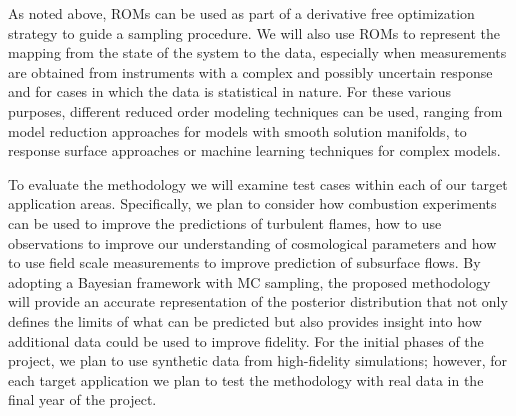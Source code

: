 \documentclass[11pt]{article}
\begin{document}
As noted above, ROMs can be used as
part of a derivative free optimization strategy
to guide a sampling procedure. We will also use ROMs to represent the mapping from the state of the system
to the data, especially when measurements are obtained from instruments with a complex and possibly uncertain response and for cases in which the data is statistical in nature. For these various purposes, different reduced order modeling techniques can be used, ranging from model reduction approaches for models with smooth solution manifolds, to response surface approaches or machine learning techniques for complex models.

To evaluate the methodology we will examine test cases within each of our target application areas.
Specifically, we plan to consider how combustion experiments can be used to improve
the predictions of turbulent flames, how to use observations to improve our understanding of
cosmological parameters and how to use field scale measurements to improve prediction of subsurface
flows.
By adopting a Bayesian framework with MC sampling, the proposed methodology will provide an accurate representation of the posterior distribution that not only defines the limits of what can be predicted but also provides insight into how additional data could be used to improve fidelity. For the initial phases of the project, we plan to use synthetic data from high-fidelity simulations; however, for each target application we
plan to test the methodology with real data in the final year of the project.
\end{document}
